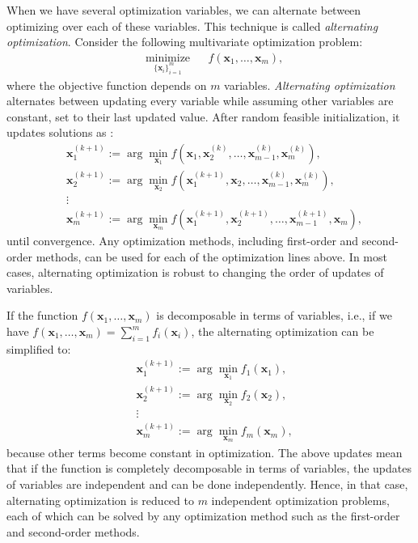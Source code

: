 \documentclass[lang=cn,10pt]{gorgeousnbook}
\numberwithin{equation}{section}%
\numberwithin{figure}{section}%
\begin{document}
When we have several optimization variables, we can alternate between optimizing over each of these variables. This technique is called \textit{alternating optimization}.
Consider the following multivariate optimization problem:
\begin{equation}
\begin{aligned}
& \underset{\{\boldsymbol{x}_i\}_{i=1}^m}{\text{minimize}}
& & f(\boldsymbol{x}_1, \dots, \boldsymbol{x}_m),
\end{aligned}
\end{equation}
where the objective function depends on $m$ variables. 
\textit{Alternating optimization} alternates between updating every variable while assuming other variables are constant, set to their last updated value. After random feasible initialization, it updates solutions as \cite{li2019alternating}:
\begin{align*}
& \boldsymbol{x}_1^{(k+1)} := \arg \min_{\boldsymbol{x}_1} f(\boldsymbol{x}_1, \boldsymbol{x}_2^{(k)}, \dots, \boldsymbol{x}_{m-1}^{(k)}, \boldsymbol{x}_m^{(k)}), \\
& \boldsymbol{x}_2^{(k+1)} := \arg \min_{\boldsymbol{x}_2} f(\boldsymbol{x}_1^{(k+1)}, \boldsymbol{x}_2, \dots, \boldsymbol{x}_{m-1}^{(k)}, \boldsymbol{x}_m^{(k)}), \\
& \vdots \\
& \boldsymbol{x}_m^{(k+1)} := \arg \min_{\boldsymbol{x}_m} f(\boldsymbol{x}_1^{(k+1)}, \boldsymbol{x}_2^{(k+1)}, \dots, \boldsymbol{x}_{m-1}^{(k+1)}, \boldsymbol{x}_m), 
\end{align*}
until convergence. 
Any optimization methods, including first-order and second-order methods, can be used for each of the optimization lines above. 
In most cases, alternating optimization is robust to changing the order of updates of variables. 

\begin{remark}
If the function $f(\boldsymbol{x}_1, \dots, \boldsymbol{x}_m)$ is decomposable in terms of variables, i.e., if we have $f(\boldsymbol{x}_1, \dots, \boldsymbol{x}_m) = \sum_{i=1}^m f_i(\boldsymbol{x}_i)$, the alternating optimization can be simplified to:
\begin{align*}
& \boldsymbol{x}_1^{(k+1)} := \arg \min_{\boldsymbol{x}_1} f_1(\boldsymbol{x}_1), \\
& \boldsymbol{x}_2^{(k+1)} := \arg \min_{\boldsymbol{x}_2} f_2(\boldsymbol{x}_2), \\
& \vdots \\
& \boldsymbol{x}_m^{(k+1)} := \arg \min_{\boldsymbol{x}_m} f_m(\boldsymbol{x}_m),
\end{align*}
because other terms become constant in optimization. 
The above updates mean that if the function is completely decomposable in terms of variables, the updates of variables are independent and can be done independently. Hence, in that case, alternating optimization is reduced to $m$ independent optimization problems, each of which can be solved by any optimization method such as the first-order and second-order methods.
\end{remark}
\end{document}
